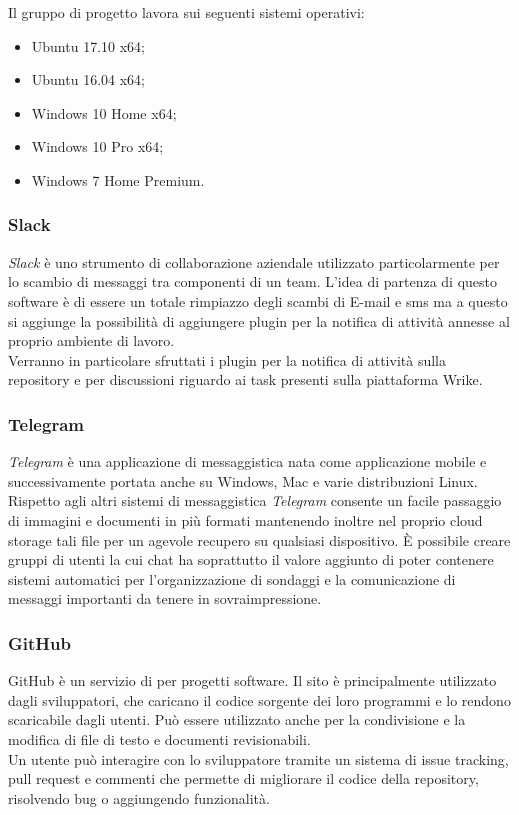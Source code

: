 \documentclass[../NormediProgetto.tex]{subfiles}
\begin{document}
	Il gruppo di progetto lavora sui seguenti sistemi operativi:
	\begin{itemize}
		\item Ubuntu 17.10 x64;
		\item Ubuntu 16.04  x64;
		\item Windows 10 Home x64;
		\item Windows 10 Pro x64;
		\item Windows 7 Home Premium.
	\end{itemize}
	
	\subsubsection{Slack}
	
	\textit{Slack} è uno strumento di collaborazione aziendale utilizzato particolarmente per lo scambio di messaggi tra componenti di un team. L'idea di partenza di questo software è di essere un totale rimpiazzo degli scambi di E-mail e sms ma a questo si aggiunge la possibilità di aggiungere plugin per la notifica di attività annesse al proprio ambiente di lavoro.
	\\ \noindent Verranno in particolare sfruttati i plugin per la notifica di attività sulla repository e per discussioni riguardo ai task presenti sulla piattaforma Wrike.
	
	\subsubsection{Telegram}
	
	\textit{Telegram} è una applicazione di messaggistica nata come applicazione mobile e successivamente portata anche su Windows, Mac e varie distribuzioni Linux. Rispetto agli altri sistemi di messaggistica \textit{Telegram} consente un facile passaggio di immagini e documenti in più formati mantenendo inoltre nel proprio cloud storage tali file per un agevole recupero su qualsiasi dispositivo. È possibile creare gruppi di utenti la cui chat ha soprattutto il valore aggiunto di poter contenere sistemi automatici per l'organizzazione di sondaggi e la comunicazione di messaggi importanti da tenere in sovraimpressione.
	
	\subsubsection{GitHub}
	
	GitHub è un servizio di  per progetti software. 
	Il sito è principalmente utilizzato dagli sviluppatori, che caricano il codice sorgente dei loro programmi e lo rendono scaricabile dagli utenti. Può essere utilizzato anche per la condivisione e la modifica di file di testo e documenti revisionabili.
	\\ \noindent Un utente può interagire con lo sviluppatore tramite un sistema di issue tracking, pull request e commenti che permette di migliorare il codice della repository, risolvendo bug o aggiungendo funzionalità.
\end{document}
